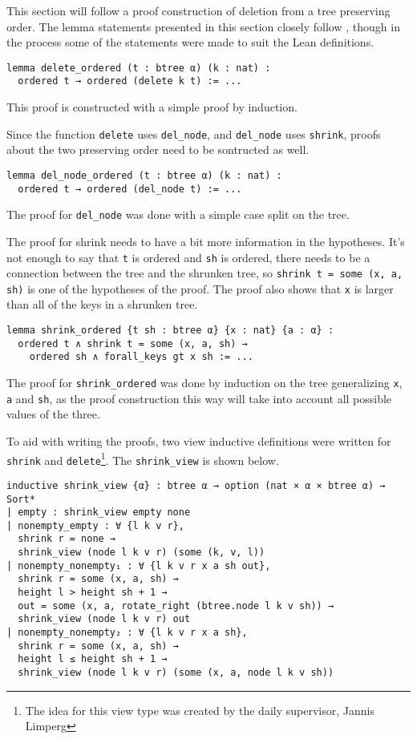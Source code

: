 This section will follow a proof construction of deletion from a tree preserving order. The lemma statements presented in this section closely follow \cite{textbook:discrete_computer}, though in the process some of the statements were made to suit the Lean definitions.

\begin{lstlisting}
lemma delete_ordered (t : btree α) (k : nat) :
  ordered t → ordered (delete k t) := ...
\end{lstlisting}

This proof is constructed with a simple proof by induction. 

Since the function \lstinline{delete} uses \lstinline{del_node}, and \lstinline{del_node} uses \lstinline{shrink}, proofs about the two preserving order need to be sontructed as well.

\begin{lstlisting}
lemma del_node_ordered (t : btree α) (k : nat) :
  ordered t → ordered (del_node t) := ...
\end{lstlisting}

The proof for \lstinline{del_node} was done with a simple case split on the tree.

The proof for shrink needs to have a bit more information in the hypotheses. It's not enough to say that \lstinline{t} is ordered and \lstinline{sh} is ordered, there needs to be a connection between the tree and the shrunken tree, so \lstinline{shrink t = some (x, a, sh)} is one of the hypotheses of the proof. The proof also shows that \lstinline{x} is larger than all of the keys in a shrunken tree. 

\begin{lstlisting}
lemma shrink_ordered {t sh : btree α} {x : nat} {a : α} :
  ordered t ∧ shrink t = some (x, a, sh) →
    ordered sh ∧ forall_keys gt x sh := ...
\end{lstlisting}

The proof for \lstinline{shrink_ordered} was done by induction on the tree generalizing \lstinline{x}, \lstinline{a} and \lstinline{sh}, as the proof construction this way will take into account all possible values of the three.

To aid with writing the proofs, two view inductive definitions were written for \lstinline{shrink} and \lstinline{delete}\footnote{The idea for this view type was created by the daily supervisor, Jannis Limperg}. The \lstinline{shrink_view} is shown below.

\begin{lstlisting}
inductive shrink_view {α} : btree α → option (nat × α × btree α) → Sort*
| empty : shrink_view empty none
| nonempty_empty : ∀ {l k v r},
  shrink r = none →
  shrink_view (node l k v r) (some (k, v, l))
| nonempty_nonempty₁ : ∀ {l k v r x a sh out},
  shrink r = some (x, a, sh) →
  height l > height sh + 1 →
  out = some (x, a, rotate_right (btree.node l k v sh)) →
  shrink_view (node l k v r) out
| nonempty_nonempty₂ : ∀ {l k v r x a sh},
  shrink r = some (x, a, sh) →
  height l ≤ height sh + 1 →
  shrink_view (node l k v r) (some (x, a, node l k v sh))
\end{lstlisting}

